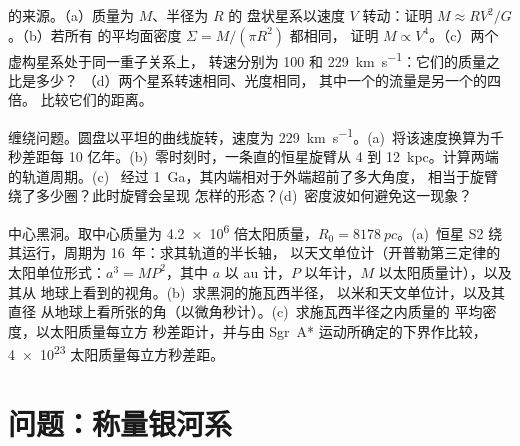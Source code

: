 \begin{exercise}[$\star\star\star$]\label{exo:b3:milky-way-galaxies:10}
的来源。（a）质量为 $M$、半径为 $R$ 的
盘状星系以速度 $V$ 转动：证明 $M \approx RV^2/G$。（b）若所有
的平均面密度 $\Sigma = M/(\pi R^2)$ 都相同，
证明 $M \propto V^4$。（c）两个虚构星系处于同一重子关系上，
转速分别为 100 和 \qty{229}{km.s^{-1}}：它们的质量之比是多少？
（d）两个星系转速相同、光度相同，
其中一个的流量是另一个的四倍。
比较它们的距离。
\end{exercise}

\begin{exercise}[$\star\star\star$]\label{exo:b3:milky-way-galaxies:11}
缠绕问题。圆盘以平坦的曲线旋转，速度为
\qty{229}{km.s^{-1}}。(a)~将该速度换算为千秒差距每
10 亿年。(b)~零时刻时，一条直的恒星旋臂从 4 到
\qty{12}{kpc}。计算两端的轨道周期。(c)~
经过 \qty{1}{Ga}，其内端相对于外端超前了多大角度，
相当于旋臂绕了多少圈？此时旋臂会呈现
怎样的形态？(d)~密度波如何避免这一现象？
\end{exercise}

\begin{exercise}[$\star\star\star$]\label{exo:b3:milky-way-galaxies:12}
中心黑洞。取中心质量为
\num{4.2e6} 倍太阳质量，$R_0 = \qty{8178}{pc}$。(a)~恒星 S2
绕其运行，周期为 \num{16}~年：求其轨道的半长轴，
以天文单位计（开普勒第三定律的太阳单位形式：$a^3 = MP^2$，其中
$a$ 以 au 计，$P$ 以年计，$M$ 以太阳质量计），以及其从
地球上看到的视角。(b)~求黑洞的施瓦西半径，
以米和天文单位计，以及其直径
从地球上看所张的角（以微角秒计）。(c)~求施瓦西半径之内质量的
平均密度，以太阳质量每立方
秒差距计，并与由 Sgr~A* 运动所确定的下界作比较，
\num{4e23} 太阳质量每立方秒差距。
\end{exercise}

\section{问题：称量银河系}

